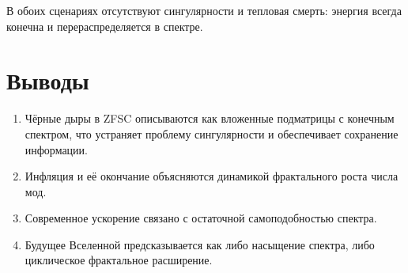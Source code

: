 \documentclass[12pt,a4paper]{article}
\begin{document}
В обоих сценариях отсутствуют сингулярности и тепловая смерть: энергия всегда конечна и перераспределяется в спектре.

\section{Выводы}
\begin{enumerate}
  \item Чёрные дыры в ZFSC описываются как вложенные подматрицы с конечным спектром, что устраняет проблему сингулярности и обеспечивает сохранение информации.
  \item Инфляция и её окончание объясняются динамикой фрактального роста числа мод.
  \item Современное ускорение связано с остаточной самоподобностью спектра.
  \item Будущее Вселенной предсказывается как либо насыщение спектра, либо циклическое фрактальное расширение.
\end{enumerate}
\end{document}
